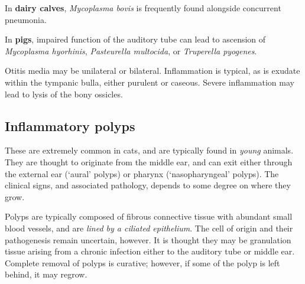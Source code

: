 \documentclass[openany]{book}
\begin{document}
In \textbf{dairy calves}, \emph{Mycoplasma bovis} is frequently found
alongside concurrent pneumonia.

In \textbf{pigs}, impaired function of the auditory tube can lead to
ascension of \emph{Mycoplasma hyorhinis}, \emph{Pasteurella multocida},
or \emph{Truperella pyogenes}.

Otitis media may be unilateral or bilateral. Inflammation is typical, as
is exudate within the tympanic bulla, either purulent or caseous. Severe
inflammation may lead to lysis of the bony ossicles.

\subsection{Inflammatory polyps}\label{inflammatory-polyps}

These are extremely common in cats, and are typically found in
\emph{young} animals. They are thought to originate from the middle ear,
and can exit either through the external ear (`aural' polyps) or pharynx
(`nasopharyngeal' polyps). The clinical signs, and associated pathology,
depends to some degree on where they grow.

Polyps are typically composed of fibrous connective tissue with abundant
small blood vessels, and are \emph{lined by a ciliated epithelium}. The
cell of origin and their pathogenesis remain uncertain, however. It is
thought they may be granulation tissue arising from a chronic infection
either to the auditory tube or middle ear. Complete removal of polyps is
curative; however, if some of the polyp is left behind, it may regrow.


\end{document}
